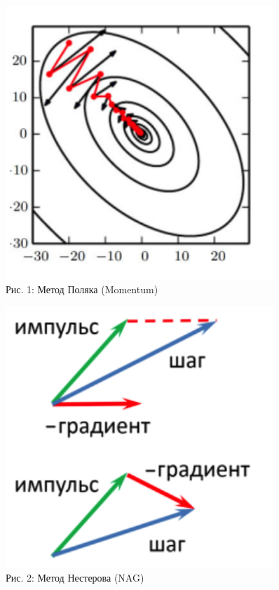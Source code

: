 \begin{figure}[h!]
    \centering
    \begin{minipage}[t]{0.45\textwidth}
        \centering
        \includegraphics[width=0.9\textwidth]{chapters/neural/images/polyak.png}
        \\[0.5em]
        Рис. 1: Метод Поляка (Momentum)
    \end{minipage}%
    \hfill
    \begin{minipage}[t]{0.45\textwidth}
        \centering
        \includegraphics[width=0.9\textwidth]{chapters/neural/images/nesterov.png}
        \\[0.5em]
        Рис. 2: Метод Нестерова (NAG)
    \end{minipage}
\end{figure}

